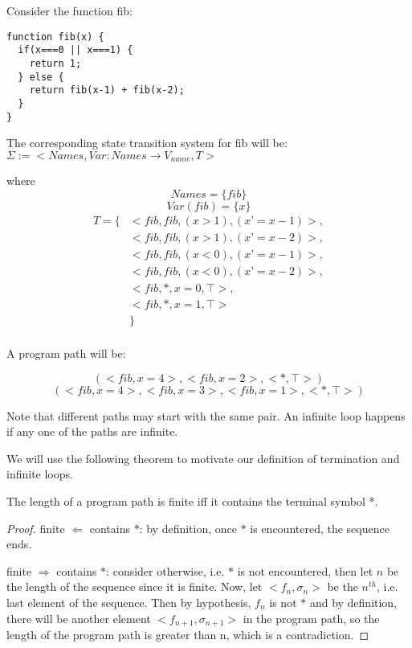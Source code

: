 \begin{example}
  Consider the function fib:
\begin{lstlisting}
function fib(x) {
  if(x===0 || x===1) {
    return 1;
  } else {
    return fib(x-1) + fib(x-2);
  }
}
\end{lstlisting}

The corresponding state transition system for fib will be:
$\Sigma := < Names, Var : Names \to V_{name}, T>$

where
\[
Names = \{fib\}
\]
\[
Var(fib) = \{x\}
\]
\[
\begin{aligned}
T = \{ &< fib, fib, (x>1), (x’=x-1) >, \\
   & < fib, fib, (x>1), (x’=x-2) >, \\
   & < fib, fib, (x<0), (x’=x-1) >, \\
   & < fib, fib, (x<0), (x’=x-2) >, \\
   & < fib, *, x=0, \top >, \\
   & < fib, *, x=1, \top > \\
   & \} \\
\end{aligned}
\]

A program path will be:

\[(< fib, x=4 >, < fib, x=2 >, < *, \top >)\]
\[(< fib, x=4 >, < fib, x=3 >, < fib, x=1 >, < *, \top >)\]

Note that different paths may start with the same pair. An infinite loop happens if any one of
the paths are infinite.

\end{example}


We will use the following theorem to motivate our definition of termination and infinite loops.

\begin{theorem}
  The length of a program path is finite iff it contains the terminal symbol *.
\end{theorem}

\begin{proof}
  
  finite $\Leftarrow$ contains $*$: by definition, once $*$ is encountered, the sequence ends.
  
  finite $\Rightarrow$ contains $*$: consider otherwise, i.e. $*$ is not encountered, then let $n$ be the length of the sequence since it is finite.
  Now, let $<f_n, \sigma_n>$ be the $n^{th}$, i.e. last element of the sequence. Then by hypothesis, $f_n$ is not $*$ and by definition, there will be another element $<f_{n+1}, \sigma_{n+1}>$ in the program path, so the length of the program path is greater than n, which is a contradiction.
\end{proof}

